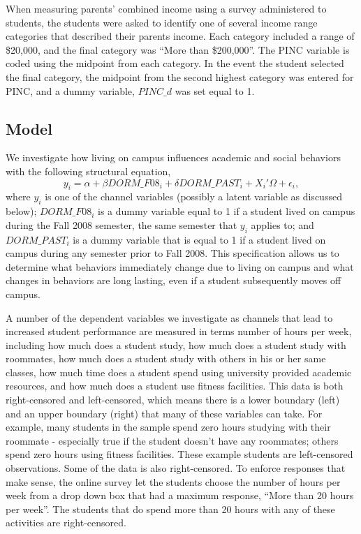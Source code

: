 \documentclass[10pt]{article}
\newcommand{\beq}{\begin{equation}}
\newcommand{\eeq}{\end{equation}}
\begin{document}
When measuring parents' combined income using a survey administered to students, the students were asked to identify one of several income range categories that described their parents income.  Each category included a range of \$20,000, and the final category was ``More than \$200,000''.  The PINC variable is coded using the  midpoint from each category.  In the event the student selected the final category, the midpoint from the second highest category was entered for PINC, and a dummy variable, $PINC\_d$ was set equal to 1.

\subsection{Model}
We investigate how living on campus influences academic and social behaviors with the following structural equation,
\beq \label{eq:channel} y_i = \alpha + \beta DORM\_F08_i + \delta DORM\_PAST_i + X_i'\Omega + \epsilon_i,\eeq
where $y_i$ is one of the channel variables (possibly a latent variable as discussed below); $DORM\_F08_i$ is a dummy variable equal to 1 if a student lived on campus during the Fall 2008 semester, the same semester that $y_i$ applies to; and $DORM\_PAST_i$ is a dummy variable that is equal to 1 if a student lived on campus during any semester prior to Fall 2008.  This specification allows us to determine what behaviors immediately change due to living on campus and what changes in behaviors are long lasting, even if a student subsequently moves off campus.

A number of the dependent variables we investigate as channels that lead to increased student performance are measured in terms number of hours per week, including how much does a student study, how much does a student study with roommates, how much does a student study with others in his or her same classes, how much time does a student spend using university provided academic resources, and how much does a student use fitness facilities.  This data is both right-censored and left-censored, which means there is a lower boundary (left) and an upper boundary (right) that many of these variables can take.  For example, many students in the sample spend zero hours studying with their roommate - especially true if the student doesn't have any roommates; others spend zero hours using fitness facilities.  These example students are left-censored observations.  Some of the data is also right-censored.  To enforce responses that make sense, the online survey let the students choose the number of hours per week from a drop down box that had a maximum response, ``More than 20 hours per week''.  The students that do spend more than 20 hours with any of these activities are right-censored.
\end{document}
